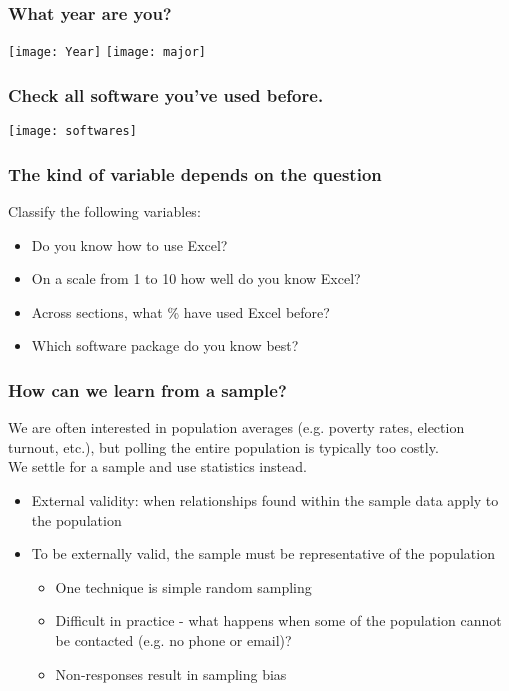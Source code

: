 \documentclass[11pt]{beamer}
\begin{document}
\begin{frame}
 \frametitle{What year are you?}
 \begin{center}
 \texttt{[image: Year]} 
  \texttt{[image: major]} 
 \end{center}
\end{frame}

\begin{frame}
 \frametitle{Check all software you've used before.}
 \begin{center}
 \texttt{[image: softwares]} %
 \end{center}
\end{frame}

\begin{frame}
 \frametitle{The kind of variable depends on the question}
Classify the following variables:
\begin{itemize}
\item Do you know how to use Excel? \pause
\item On a scale from 1 to 10 how well do you know Excel? \pause
\item Across sections, what \% have used Excel before? \pause
\item Which software package do you know best?
\end{itemize}
\end{frame}

\begin{frame}
 \frametitle{How can we learn from a sample?}
 We are often interested in \alert{population} averages (e.g. poverty rates, election turnout, etc.), but polling the entire population is typically too costly. \\ \pause
 \bigskip We settle for a \alert{sample} and use statistics instead. \\ \pause
 \bigskip
{}
\begin{itemize}
\item \alert{External validity}: when relationships found within the sample data apply to the population \pause
\item To be externally valid, the sample must be \alert{representative} of the population \pause
\begin{itemize}
	\item One technique is \alert{simple random sampling} \pause
	\item Difficult in practice - what happens when some of the population cannot be contacted (e.g. no phone or email)? \pause
	\item Non-responses result in \alert{sampling bias}
\end{itemize}
\end{itemize}
\end{frame}
\end{document}
